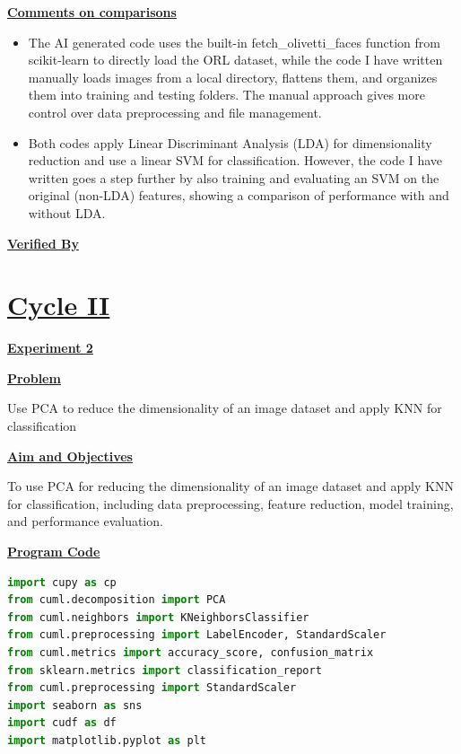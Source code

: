 \documentclass[a4paper,12pt]{article}
\begin{document}
\vspace{1em}
\noindent
\textbf{\underline{Comments on comparisons}}
\noindent
\begin{itemize}
    \item The AI generated code uses the built-in fetch\_olivetti\_faces function from scikit-learn to directly load the ORL dataset, while the code I have written manually loads images from a local directory, flattens them, and organizes them into training and testing folders. The manual approach gives more control over data preprocessing and file management.
    \item Both codes apply Linear Discriminant Analysis (LDA) for dimensionality reduction and use a linear SVM for classification. However, the code I have written goes a step further by also training and evaluating an SVM on the original (non-LDA) features, showing a comparison of performance with and without LDA.
\end{itemize}
\vfill
\noindent
\textbf{\underline{Verified By}}
\noindent
\vspace{3em}

\newpage

\section*{\underline{Cycle II}}
\begin{center}
\textbf{\underline{Experiment 2}}
\label{exp2}
\end{center}

\vspace{1em}
\noindent
\textbf{\underline{Problem}}\par
\noindent
Use PCA to reduce the dimensionality of an image dataset and apply KNN for classification\par

\vspace{1em}
\noindent
\textbf{\underline{Aim and Objectives}}\par
\noindent
To use PCA for reducing the dimensionality of an image dataset and apply KNN for classification, including data preprocessing, feature reduction, model training, and performance evaluation.

\vspace{1em}
\noindent
\textbf{\underline{Program Code}}
\noindent
\begin{lstlisting}[language=Python]
import cupy as cp
from cuml.decomposition import PCA
from cuml.neighbors import KNeighborsClassifier
from cuml.preprocessing import LabelEncoder, StandardScaler
from cuml.metrics import accuracy_score, confusion_matrix
from sklearn.metrics import classification_report
from cuml.preprocessing import StandardScaler
import seaborn as sns
import cudf as df
import matplotlib.pyplot as plt
\end{lstlisting}
\end{document}
